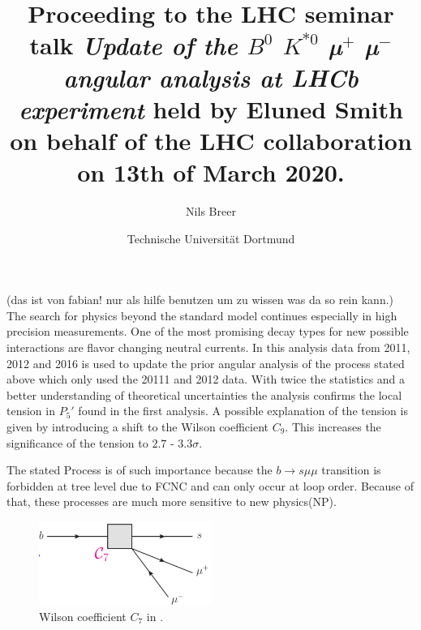 


\setlength{\oddsidemargin}{0.0 cm}
\setlength{\evensidemargin}{0.0 cm}
\setlength{\topmargin}{-1cm}
\setlength{\textheight}{24 cm}
\setlength{\textwidth}{16 cm}

\pagestyle{plain}

\setlength{\parindent}{0in}



\author{Nils Breer}
\date{Technische Universit\"at Dortmund}

\title{Proceeding to the LHC seminar talk \textit{Update of the $B^0$ \to $K^{*0}$ µ$^{+}$ µ$^{-}$ angular analysis at LHCb experiment} held by Eluned Smith on behalf of the LHC collaboration on 13th of March 2020.}

\maketitle

(das ist von fabian! nur als hilfe benutzen um zu wissen was da so rein kann.)
The search for physics beyond the standard model continues especially in high precision measurements. One of the most promising decay types for new possible interactions are flavor changing neutral currents. In this analysis data from 2011, 2012 and 2016 is used to update the prior angular analysis of the process stated above which only used the 20111 and 2012 data. With twice the statistics and a better understanding of theoretical uncertainties the analysis confirms the local tension in $P_5\prime$ found in the first analysis. A possible explanation of the tension is given by introducing a shift to the Wilson coefficient $C_9$. This increases the significance of the tension to $2.7$ - $3.3\sigma$.

The stated Process is of such importance because the
$b \to s \mu \mu$ transition is forbidden at tree level due to FCNC and can only occur at loop order.
Because of that, these processes are much more sensitive to new physics(NP).

\begin{figure}[htb]
  \centering
  \includegraphics[width=0.5\textwidth]{flavor_plots/wilson_c7.png}
  \caption{Wilson coefficient $C_7$ in .}
  \label{fig:sm_process}
\end{figure}

